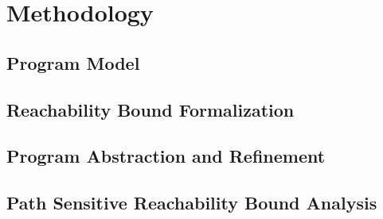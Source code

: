 \documentclass[a4paper,11pt]{article}
\begin{document}
\section{Methodology}
\label{sec:reachability-analysis}

\subsection{{Program Model}}
\label{sec:language}
% 
\subsection{{Reachability Bound Formalization}}
\label{sec:execution_rb}
% 
% 
\subsection{Program Abstraction and Refinement}
\label{sec:reachability-program_refine}

\subsection{Path Sensitive Reachability Bound Analysis}
\label{sec:reachability-analysis}



\section*{}
%
\end{document}
